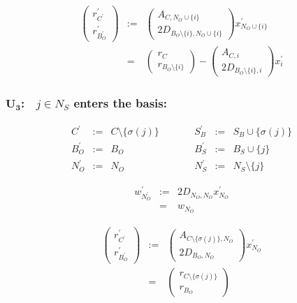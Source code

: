 \documentclass[a4paper]{article}
\begin{document}
\begin{eqnarray}
\left(
\begin{array}{c}
r_{C^{\prime}}^{\prime} \\
\hline
r_{B_{O}^{\prime}}^{\prime}
\end{array}
\right)
&:=&
\left(
\begin{array}{c}
A_{C, N_{O} \cup \{i\}} \\
\hline
2D_{B_{O} \setminus \{i\}, N_{O} \cup \{i\}} 
\end{array}
\right)
x_{N_{O} \cup \{i\}}^{\prime}
\nonumber \\
&=&
\left(
\begin{array}{c}
r_{C} \\
\hline
r_{B_{O} \setminus \{i\}}
\end{array}
\right)
-
\left(
\begin{array}{c}
A_{C, i} \\
\hline
2D_{B_{O} \setminus \{i\}, i}
\end{array}
\right)
x_{i}^{\prime}
\end{eqnarray}

\subsubsection{$\mathbf{U_{3}}$:$\quad j \in N_{S}$ enters the basis:}
\begin{equation}
\label{update:slack_enters_basis}
\begin{array}{ccccccc}
C^{\prime}      &:=&  C \setminus \{\sigma(j)\}
&\quad\quad&
S_{B}^{\prime}  &:=&  S_{B} \cup \{\sigma(j)\}  \\
B_{O}^{\prime}  &:=&  B_{O}
&\quad\quad&
B_{S}^{\prime}  &:=&  B_{S} \cup \{j\}  \\
N_{O}^{\prime}  &:=&  N_{O}
&\quad\quad&
N_{S}^{\prime}  &:=&  N_{S} \setminus \{j\} 
\end{array}
\end{equation}

\begin{eqnarray}
w_{N_{O}^{\prime}}^{\prime}
&:=&
2D_{N_{O}, N_{O}}x_{N_{O}}^{\prime}
\nonumber \\
&=&
w_{N_{O}}
\end{eqnarray}

\begin{eqnarray}
\left(
\begin{array}{c}
r_{C^{\prime}}^{\prime} \\
\hline
r_{B_{O}^{\prime}}^{\prime}
\end{array}
\right)
&:=&
\left(
\begin{array}{c}
A_{C \setminus \{\sigma(j)\}, N_{O}} \\
\hline
2D_{B_{O}, N_{O}}
\end{array}
\right)
x_{N_{O}}^{\prime}
\nonumber \\
&=&
\left(
\begin{array}{c}
r_{C \setminus \{\sigma(j)\}} \\
\hline
r_{B_{O}}
\end{array}
\right)
\end{eqnarray}
\end{document}
